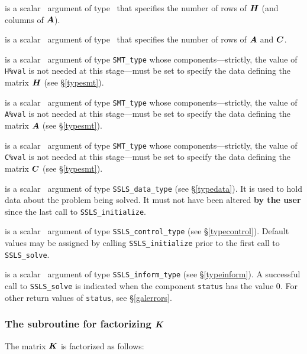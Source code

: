 \documentclass{galahad}
\newcommand{\packagename}{SSLS}
\begin{document}
\begin{description}
 is a scalar \intentin\ argument of type \integer\ that specifies
the number of rows of ${\bm{H}}$ (and columns of ${\bm{A}}$).

 is a scalar \intentin\ argument of type \integer\ that specifies
the number of rows of ${\bm{A}}$ and ${\bm{C}}$.

 is a scalar \intentin\ argument of type {\tt SMT\_type} whose
components---strictly, the value of {\tt H\%val} is not needed at this 
stage---must be set to specify the data defining the matrix ${\bm{H}}$
(see \S\ref{typesmt}).

 is a scalar \intentin\ argument of type {\tt SMT\_type} whose
components---strictly, the value of {\tt A\%val} is not needed at this 
stage---must be set to specify the data defining the matrix ${\bm{A}}$
(see \S\ref{typesmt}).

 is a scalar \intentin\ argument of type {\tt SMT\_type} whose
components---strictly, the value of {\tt C\%val} is not needed at this 
stage---must be set to specify the data defining the matrix ${\bm{C}}$
(see \S\ref{typesmt}).

 is a scalar \intentinout\ argument of type
{\tt \packagename\_data\_type}
(see \S\ref{typedata}). It is used to hold data about the problem being
solved. It must not have been altered {\bf by the user} since the last call to
{\tt \packagename\_initialize}.

 is a scalar \intentin\ argument of type
{\tt \packagename\_control\_type}
(see \S\ref{typecontrol}). Default values may be assigned by calling
{\tt \packagename\_initialize} prior to the first call to
{\tt \packagename\_solve}.

 is a scalar \intentout\ argument of type
{\tt \packagename\_inform\_type}
(see \S\ref{typeinform}). A successful call to
{\tt \packagename\_solve}
is indicated when the  component {\tt status} has the value 0.
For other return values of {\tt status}, see \S\ref{galerrors}.

\end{description}


\subsubsection{The subroutine for factorizing ${\bm{K}}$}
The matrix ${\bm{K}}$ is factorized as follows:
\vspace*{1mm}
\end{document}
